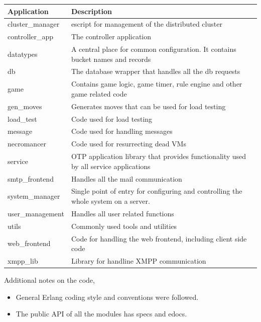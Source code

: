\documentclass[11pt,a4paper]{report}
\begin{document}
\begin{center}
    \begin{tabular}{ | l | p{10cm} |}
    \hline
    Application & Description \\ \hline \hline
    cluster\_manager & escript for management of the distributed
    cluster \\ \hline
    controller\_app & The controller application \\ \hline
    datatypes & A central place for common configuration. It contains bucket
    names and records \\ \hline
    db & The database wrapper that handles all the db requests\\ \hline
    game & Contains game logic, game timer, rule engine and other game
    related code \\ \hline
    gen\_moves & Generates moves that can be used for load testing \\ \hline
    load\_test & Code used for load testing \\ \hline
    message & Code used for handling messages \\ \hline
    necromancer & Code used for resurrecting dead VMs \\ \hline
    service &  OTP application library that provides functionality used by
    all service applications \\ \hline
    smtp\_frontend & Handles all the mail communication \\ \hline
    system\_manager & Single point of entry for configuring and controlling
    the whole system on a server. \\ \hline
    user\_management & Handles all user related functions \\ \hline
    utils & Commonly used tools and utilities \\ \hline
    web\_frontend & Code for handling the web frontend, including client
    side code \\ \hline
    xmpp\_lib & Library for handline XMPP communication \\ \hline \hline
    \end{tabular}
\end{center}



Additional notes on the code,

\begin{itemize}
\item General Erlang coding style and conventions were followed.
\item The public API of all the modules has specs and edocs.
\end{itemize}
\end{document}
